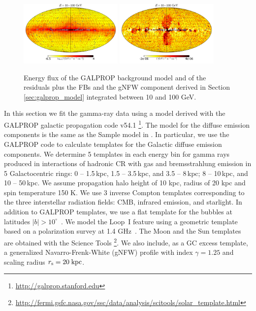 \begin{figure}[h]
\centering
\includegraphics[width=0.45\textwidth]{plots/Mollwiede_GALPROP_model_source_range2_log.pdf}
 \includegraphics[width=0.45\textwidth]{plots/Mollwiede_GALPROP_source_range2.pdf}
 \caption{Energy flux of the GALPROP background model 
 and of the residuals plus the FBs and the gNFW component derived in Section \ref{sec:galprop_model}
 integrated between 10 and 100 GeV.}
 \label{fig:Maps_GALPROP}
\end{figure}

In this section we fit the gamma-ray data using a model derived with the GALPROP
galactic propagation code v54.1
\citep{Moskalenko:1997gh, Strong:1998fr, Strong:2004de, Ptuskin:2005ax, 2007ARNPS..57..285S, Porter:2008ve,Vladimirov:2010aq}\footnote{\url{http://galprop.stanford.edu}}. 
The model for the diffuse emission components is the same as the Sample model in \cite{2017ApJ...840...43A}.
In particular, we use the GALPROP code to calculate templates for the Galactic diffuse emission components.
We determine 5 templates in each energy bin for gamma rays produced in 
interactions of hadronic CR with gas and bremsstrahlung emission in 5 Galactocentric rings: 
0 -- 1.5\,kpc, 1.5 -- 3.5\,kpc, and 3.5 -- 8\,kpc; 8 -- 10\,kpc, and 10 -- 50\,kpc.
We assume propagation halo height of 10 kpc, radius of 20 kpc and spin temperature 150 K.
We use 3 inverse Compton templates corresponding to the three interstellar radiation fields: CMB, 
infrared emission, and starlight.
In addition to GALPROP templates, we use a flat template for the \Fermi bubbles at latitudes $|b| > 10^\circ$~\citep{2014ApJ...793...64A}. 
We model the Loop~I feature using a geometric template \citep[e.g., Figure 2 of][]{2014ApJ...793...64A}
based on a polarization survey at 1.4 GHz~\citep{Wolleben:2007pq}.
The Moon and the Sun \citep{2007Ap&SS.309..359O, 2006ApJ...652L..65M, 2008A&A...480..847O, 2013arXiv1307.0197J} templates 
are obtained with the \Fermi Science Tools%
\footnote{\url{http://fermi.gsfc.nasa.gov/ssc/data/analysis/scitools/solar_template.html}}.
We also include, as a GC excess template, a generalized Navarro-Frenk-White (gNFW) profile with index $\gamma = 1.25$ 
\citep{Goodenough:2009gk,Calore:2014xka,Abazajian:2014fta}
and scaling radius $r_{\rm s} = 20\;{\rm kpc}$.


